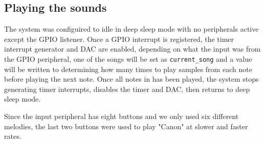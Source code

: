 \subsection{Playing the sounds}
The system was configuired to idle in deep sleep mode with no peripherals active except the GPIO listener. Once a GPIO interrupt is registered, the timer interrupt generator and DAC are enabled, depending on what the input was from the GPIO peripheral, one of the songs will be set as \texttt{current\_song} and a value will be written to  determining how many times to play samples from each note before playing the next note. Once all notes in  has been played, the system stops generating timer interrupts, disables the timer and DAC, then returns to deep sleep mode.

Since the input peripheral has eight buttons and we only used six different melodies, the last two buttons were used to play "Canon" at slower and faster rates.
